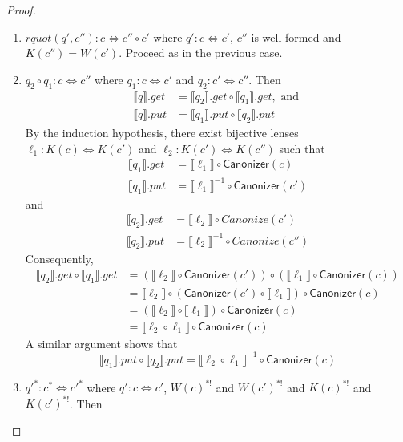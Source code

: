 \documentclass{svproc}
\newcommand{\kw}[1]{\ensuremath{\mathsf{#1}}}
\newcommand{\canonizer}{\ensuremath{\kw{Canonizer}}}
\begin{document}
\begin{proof}
\begin{enumerate}
  \item
  $\mathit{rquot}(q', c''):c \Leftrightarrow c'' \circ c'$ where $q' : c \Leftrightarrow
  c'$, $c''$ is well formed and $K(c'') = W(c')$. Proceed as in the previous
  case.
\item
$q_2 \circ q_1: c \Leftrightarrow c''$ where $q_1 : c \Leftrightarrow c'$ and
$q_2 : c' \Leftrightarrow c''$. Then
  \begin{align*}
  \llbracket q \rrbracket.get &= \llbracket q_2 \rrbracket.get\circ \llbracket
  q_1 \rrbracket.get, \text{ and }\\
  \llbracket q \rrbracket.put &= \llbracket q_1 \rrbracket.put \circ \llbracket
  q_2 \rrbracket.put
  \end{align*}
  By the induction hypothesis, there exist bijective lenses
  $\ell_1 :
  K(c) \Leftrightarrow K(c')$ and $\ell_2 : K(c') \Leftrightarrow K(c'')$ such
  that
  \begin{align*}
\llbracket q_1 \rrbracket.get &= \llbracket \ell_1 \rrbracket \circ
\canonizer(c)\\
\llbracket q_1 \rrbracket.put &= {\llbracket \ell_1 \rrbracket}^{-1} \circ
\canonizer(c')
\end{align*}
and
\begin{align*}
\llbracket q_2 \rrbracket.get &= \llbracket \ell_2 \rrbracket \circ
Canonize(c')\\
\llbracket q_2 \rrbracket.put &= {\llbracket \ell_2 \rrbracket}^{-1} \circ
Canonize(c'')
\end{align*}
Consequently,
\begin{align*}
\llbracket q_2 \rrbracket.get \circ \llbracket q_1 \rrbracket.get &=
(\llbracket \ell_2 \rrbracket \circ \canonizer(c')) \circ (\llbracket \ell_1
\rrbracket \circ \canonizer(c))\\
&= \llbracket \ell_2 \rrbracket \circ (\canonizer(c') \circ \llbracket \ell_1
\rrbracket) \circ \canonizer(c)\\
&= (\llbracket \ell_2 \rrbracket \circ \llbracket \ell_1 \rrbracket) \circ
\canonizer(c)\\
&= \llbracket \ell_2  \circ  \ell_1 \rrbracket \circ
\canonizer(c)
\end{align*} 
A similar argument shows that 
$$\llbracket q_1 \rrbracket.put \circ \llbracket q_2 \rrbracket.put =
\llbracket \ell_2  \circ  \ell_1 \rrbracket^{-1} \circ
\canonizer(c)$$
\item  
${q'}^* : c^* \Leftrightarrow {c'}^*$ where $q' : c \Leftrightarrow c'$,
$W(c)^{*!}$ and $W(c')^{*!}$ and $K(c)^{*!}$ and $K(c')^{*!}$. Then

\end{enumerate}
\end{proof}
\end{document}
